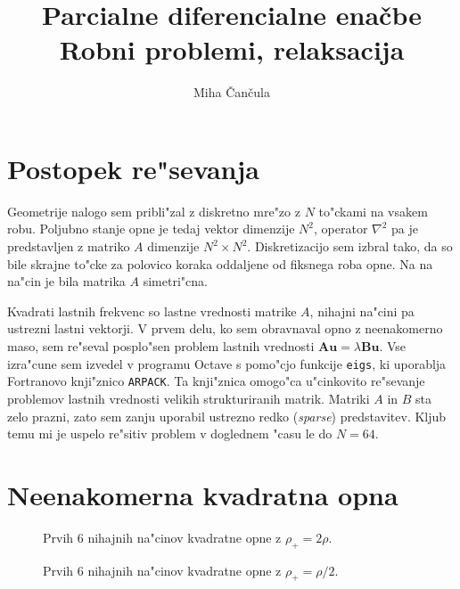 \documentclass[a4paper,10pt]{article}
\title{Parcialne diferencialne ena\v cbe \\ Robni problemi, relaksacija}
\author{Miha \v Can\v cula}
\renewcommand{\vec}{\mathbf}
\begin{document}
\maketitle

\section{Postopek re"sevanja}

Geometrije nalogo sem pribli"zal z diskretno mre"zo z $N$ to"ckami na vsakem robu. Poljubno stanje opne je tedaj vektor dimenzije $N^2$, operator $\nabla^2$ pa je predstavljen z matriko $A$ dimenzije $N^2 \times N^2$. Diskretizacijo sem izbral tako, da so bile skrajne to"cke za polovico koraka oddaljene od fiksnega roba opne. Na na na"cin je bila matrika $A$ simetri"cna. 

Kvadrati lastnih frekvenc so lastne vrednosti matrike $A$, nihajni na"cini pa ustrezni lastni vektorji. V prvem delu, ko sem obravnaval opno z neenakomerno maso, sem re"seval posplo"sen problem lastnih vrednosti $\vec A\vec u = \lambda \vec B \vec u$. Vse izra"cune sem izvedel v programu Octave s pomo"cjo funkcije \texttt{eigs}, ki uporablja Fortranovo knji"znico \texttt{ARPACK}. Ta knji"znica omogo"ca u"cinkovito re"sevanje problemov lastnih vrednosti velikih strukturiranih matrik. Matriki $A$ in $B$ sta zelo prazni, zato sem zanju uporabil ustrezno redko (\textit{sparse}) predstavitev. Kljub temu mi je uspelo re"sitiv problem v doglednem "casu le do $N = 64$. 

\section{Neenakomerna kvadratna opna}

\begin{figure}[H]
\caption{Prvih 6 nihajnih na"cinov kvadratne opne z $\rho_+ = 2\rho$. }
\end{figure}

\begin{figure}[H]
\caption{Prvih 6 nihajnih na"cinov kvadratne opne z $\rho_+ = \rho/2$. }
\end{figure}
\end{document}
